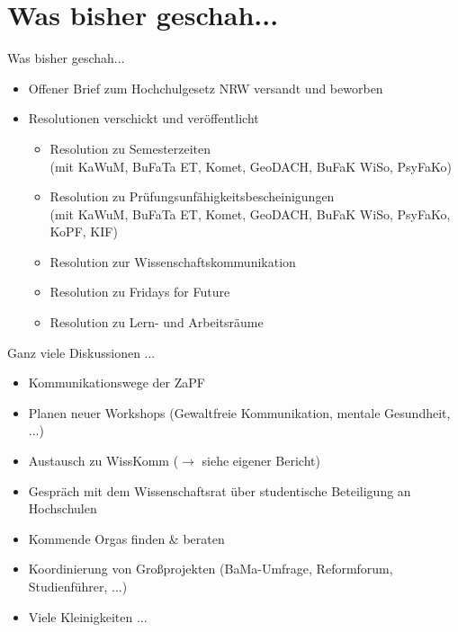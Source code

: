 \documentclass[compress, aspectratio=169]{beamer}
\begin{document}
\section{Was bisher geschah...}

\begin{frame}{Was bisher geschah...}
  \begin{itemize}
    \item Offener Brief zum Hochchulgesetz NRW versandt und beworben
    \item Resolutionen verschickt und veröffentlicht
    \begin{itemize}
        \item Resolution zu Semesterzeiten \\
          (mit KaWuM, BuFaTa ET, Komet, GeoDACH, BuFaK WiSo, PsyFaKo)
        \item Resolution zu Prüfungsunfähigkeitsbescheinigungen \\
          (mit KaWuM, BuFaTa ET, Komet, GeoDACH, BuFaK WiSo, PsyFaKo, KoPF, KIF)
        \item Resolution zur Wissenschaftskommunikation
        \item Resolution zu Fridays for Future
        \item Resolution zu Lern- und Arbeitsräume
    \end{itemize}
  \end{itemize}
\end{frame}

\begin{frame}{Ganz viele Diskussionen ...}
  \begin{itemize}
    \item Kommunikationswege der ZaPF
    \item Planen neuer Workshops (Gewaltfreie Kommunikation, mentale Gesundheit, ...)
    \item Austausch zu WissKomm ($\rightarrow$ siehe eigener Bericht)
    \item Gespräch mit dem Wissenschaftsrat über studentische Beteiligung an Hochschulen
    \item Kommende Orgas finden \& beraten
    \item Koordinierung von Großprojekten (BaMa-Umfrage, Reformforum, Studienführer, ...)
    \item Viele Kleinigkeiten ...
  \end{itemize}
\end{frame}
\end{document}
